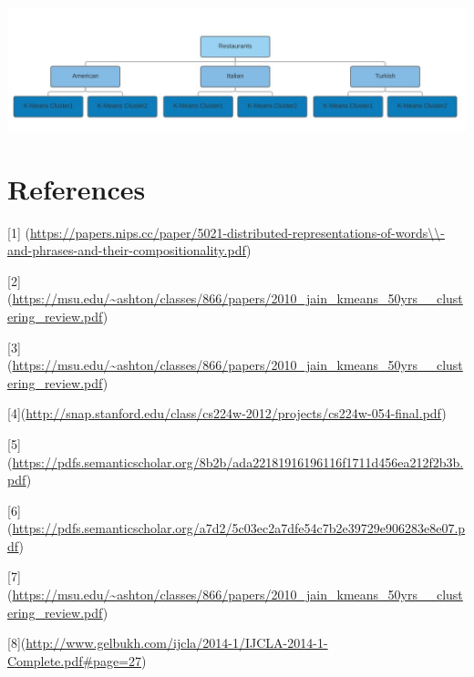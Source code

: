 \documentclass{article} %
\begin{document}
\begin{center}
  \includegraphics[width=\linewidth]{tablo.png}
\end{center}





\section{References}

[1] (\url{https://papers.nips.cc/paper/5021-distributed-representations-of-words\\-and-phrases-and-their-compositionality.pdf}) 

[2] (\url{https://msu.edu/~ashton/classes/866/papers/2010_jain_kmeans_50yrs__clustering_review.pdf}) 

[3] (\url{https://msu.edu/~ashton/classes/866/papers/2010_jain_kmeans_50yrs__clustering_review.pdf}) 


[4](\url{http://snap.stanford.edu/class/cs224w-2012/projects/cs224w-054-final.pdf})
 

[5](\url{https://pdfs.semanticscholar.org/8b2b/ada22181916196116f1711d456ea212f2b3b.pdf})



[6](\url{https://pdfs.semanticscholar.org/a7d2/5c03ec2a7dfe54c7b2e39729e906283e8e07.pdf})


[7](\url{https://msu.edu/~ashton/classes/866/papers/2010_jain_kmeans_50yrs__clustering_review.pdf}) 


[8](\url{http://www.gelbukh.com/ijcla/2014-1/IJCLA-2014-1-Complete.pdf#page=27})
\end{document}
